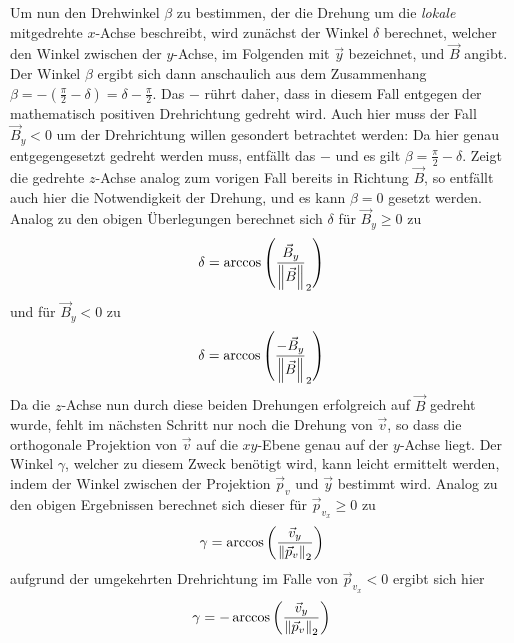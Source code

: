 Um nun den Drehwinkel \(\beta\) zu bestimmen, der die Drehung um die \textit{lokale} mitgedrehte \(x\)-Achse beschreibt, wird
zun\"achst der Winkel \(\delta\) berechnet, welcher den Winkel zwischen der \(y\)-Achse, im Folgenden mit \(\vec{y}\) bezeichnet,
und \(\vec{B}\) angibt. Der Winkel \(\beta\) ergibt sich dann anschaulich aus dem Zusammenhang
\(\beta = -\left(\frac{\pi}{2} - \delta\right) = \delta - \frac{\pi}{2}\). Das \(-\) r\"uhrt daher, dass in diesem Fall entgegen
der mathematisch positiven Drehrichtung gedreht wird. Auch hier muss der Fall \(\vec{B}_y < 0 \) um der Drehrichtung willen
gesondert betrachtet werden: Da hier genau entgegengesetzt gedreht werden muss, entf\"allt das \(-\) und es gilt
\(\beta = \frac{\pi}{2} - \delta\). Zeigt die gedrehte \(z\)-Achse analog zum vorigen Fall bereits in
Richtung \(\vec{B}\), so entf\"allt auch
hier die Notwendigkeit der Drehung, und es kann \(\beta = 0\) gesetzt werden. Analog zu den obigen \"Uberlegungen berechnet sich
\(\delta\) f\"ur \(\vec{B}_y \geq 0\) zu
\begin{equation}
  \delta = \arccos{\left(\frac{\vec{B}_y}{\left\lVert\vec{B}\right\rVert}_2\right)}
\end{equation}
und f\"ur \(\vec{B}_y < 0 \) zu
\begin{equation}
  \delta = \arccos{\left(\frac{-\vec{B}_y}{\left\lVert\vec{B}\right\rVert}_2\right)}
\end{equation}
Da die \(z\)-Achse nun durch diese beiden Drehungen erfolgreich auf \(\vec{B}\) gedreht wurde, fehlt im n\"achsten Schritt nur noch
die Drehung von \(\vec{v}\), so dass die orthogonale Projektion von \(\vec{v}\) auf die \(xy\)-Ebene genau auf der \(y\)-Achse
liegt. Der Winkel \(\gamma\), welcher zu diesem Zweck ben\"otigt wird, kann leicht ermittelt werden, indem der Winkel zwischen
der Projektion \(\vec{p}_v\) und \(\vec{y}\) bestimmt wird. Analog zu den obigen Ergebnissen berechnet sich dieser f\"ur
\(\vec{p}_{v_x} \geq 0\) zu
\begin{equation}
  \gamma = \arccos{\left(\frac{\vec{v}_y}{\left\lVert\vec{p}_v\right\rVert_2}\right)}
\end{equation}
aufgrund der umgekehrten Drehrichtung im Falle von \(\vec{p}_{v_x} < 0\) ergibt sich hier
\begin{equation}
  \gamma = -\arccos{\left(\frac{\vec{v}_y}{\left\lVert\vec{p}_v\right\rVert_2}\right)}
\end{equation}

